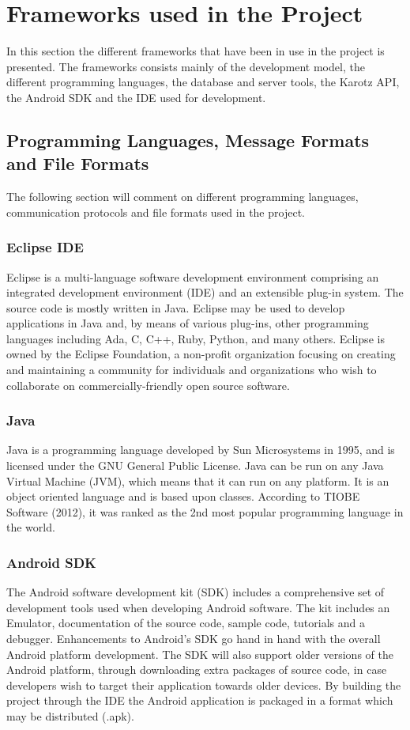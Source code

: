 \section{Frameworks used in the Project}
\label{sec:frameworks}
In this section the different frameworks that have been in use in the project is presented.
The frameworks consists mainly of the development model, the different programming languages, the 
database and server tools, the Karotz API, the Android SDK and the IDE used for development.


\subsection{Programming Languages, Message Formats and File Formats}
The following section will comment on different programming languages, communication protocols and 
file formats used in the project.

\subsubsection{Eclipse IDE}
\label{sec:Eclipse}
Eclipse \cite{Eclipse} is a multi-language software development environment comprising an integrated development environment (IDE) and an extensible plug-in system. The source code is mostly written in Java. Eclipse may be used to develop applications in Java and, by means of various plug-ins, other programming languages including Ada, C, C++, Ruby, Python, and many others. Eclipse is owned by the Eclipse Foundation, a non-profit organization focusing on creating and maintaining a community for individuals and organizations who wish to collaborate on commercially-friendly open source software. 

\subsubsection{Java}

Java is a programming language developed by Sun Microsystems in 1995, and is licensed under the GNU General Public License. 
Java can be run on any Java Virtual Machine (JVM), which means that it can run on any platform. It is an object oriented language and is based upon classes.
According to TIOBE Software (2012)\cite{TIOBE}, it was ranked as the 2nd most popular programming language in the world.


\subsubsection{Android SDK}
The Android software development kit (SDK) \cite{AndroidSDK} includes a comprehensive set of development tools used when developing Android software. The kit includes an Emulator, documentation of the source code, sample code, tutorials and a debugger. Enhancements to Android's SDK go hand in hand with the overall Android platform development. The SDK will also support older versions of the Android platform, through downloading extra packages of source code, in case developers wish to target their application towards older devices. By building the project through the IDE the Android application is packaged in a format which may be distributed (.apk). 

